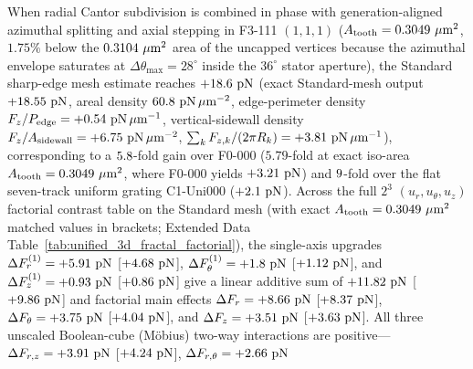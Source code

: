 \documentclass[pdflatex,sn-nature]{sn-jnl}
\DeclareRobustCommand{\roundone}[1]{\fpeval{round(#1,1)}}
\DeclareRobustCommand{\roundtwo}[1]{\fpeval{round(#1,2)}}
\DeclareRobustCommand{\roundthree}[1]{\fpeval{round(#1,3)}}
\DeclareRobustCommand{\roundfour}[1]{\fpeval{round(#1,4)}}
\begin{document}
When radial Cantor subdivision is combined in phase with generation-aligned azimuthal splitting and axial stepping in F3-111 $(1,1,1)$ ($A_{\rm tooth} = \roundfour{\NthreeUnithreedFoneoneoneUnifiedAreaUmtwo}\ \mu\text{m}^2$, $1.75\%$ below the $\roundfour{\NthreeUnithreedFzerozerozeroAreaUmtwo}\ \mu\text{m}^2$ area of the uncapped vertices because the azimuthal envelope saturates at $\Delta\theta_{\max} = 28^\circ$ inside the $36^\circ$ stator aperture), the Standard sharp-edge mesh estimate reaches $+\roundone{\NthreeUnithreedFoneoneoneUnifiedFzPn}\text{ pN}$ (exact Standard-mesh output $+\roundtwo{\NthreeUnithreedFoneoneoneUnifiedFzPn}\text{ pN}$, areal density $\roundone{\NthreeUnithreedFoneoneoneUnifiedFa}\text{ pN}\,\mu\text{m}^{-2}$, edge-perimeter density $F_z/P_{\rm edge} = +\roundthree{\NthreeUnithreedFoneoneoneUnifiedFp}\text{ pN}\,\mu\text{m}^{-1}$, vertical-sidewall density $F_z/A_{\rm sidewall} = +\roundtwo{\NthreeUnithreedFoneoneoneUnifiedFasw}\text{ pN}\,\mu\text{m}^{-2}$, $\sum_k F_{z,k}/(2\pi R_k) = +\roundtwo{\NthreeUnithreedFoneoneoneUnifiedFcirc}\text{ pN}\,\mu\text{m}^{-1}$), corresponding to a $\roundone{\NthreeUnithreedRatioFoneoneoneVsFzerozerozero}$-fold gain over F0-000 ($5.79$-fold at exact iso-area $A_{\rm tooth} = \roundfour{\NthreeUnithreedFoneoneoneUnifiedAreaUmtwo}\ \mu\text{m}^2$, where F0-000 yields $+\roundtwo{\NthreeIsothreezerofournineFzerozerozeroFzPn}\text{ pN}$) and $\roundone{\NthreeUnithreedRatioFoneoneoneVsUnizerozerozero}$-fold over the flat seven-track uniform grating C1-Uni000 ($+\roundone{\NthreeUnithreedCtrlUnizerozerozeroFzPn}\text{ pN}$). Across the full $2^3$ $(u_r, u_\theta, u_z)$ factorial contrast table on the Standard mesh (with exact $A_{\rm tooth} = \roundfour{\NthreeUnithreedFoneoneoneUnifiedAreaUmtwo}\ \mu\text{m}^2$ matched values in brackets; Extended Data Table~\ref{tab:unified_3d_fractal_factorial}), the single-axis upgrades $\Delta F_r^{(1)} = +\roundtwo{\NthreeUnithreedSingleEffectRPn}\text{ pN}$ [$+\roundtwo{\NthreeIsothreezerofournineSingleEffectRPn}\text{ pN}$], $\Delta F_\theta^{(1)} = +\roundtwo{\NthreeUnithreedSingleEffectThetaPn}\text{ pN}$ [$+\roundtwo{\NthreeIsothreezerofournineSingleEffectThetaPn}\text{ pN}$], and $\Delta F_z^{(1)} = +\roundtwo{\NthreeUnithreedSingleEffectZPn}\text{ pN}$ [$+\roundtwo{\NthreeIsothreezerofournineSingleEffectZPn}\text{ pN}$] give a linear additive sum of $+\roundtwo{\NthreeUnithreedLinearAdditiveSumPn}\text{ pN}$ [$+\roundtwo{\NthreeIsothreezerofournineLinearAdditiveSumPn}\text{ pN}$] and factorial main effects $\Delta F_r = +\roundtwo{\NthreeUnithreedMainEffectRPn}\text{ pN}$ [$+\roundtwo{\NthreeIsothreezerofournineMainEffectRPn}\text{ pN}$], $\Delta F_\theta = +\roundtwo{\NthreeUnithreedMainEffectThetaPn}\text{ pN}$ [$+\roundtwo{\NthreeIsothreezerofournineMainEffectThetaPn}\text{ pN}$], and $\Delta F_z = +\roundtwo{\NthreeUnithreedMainEffectZPn}\text{ pN}$ [$+\roundtwo{\NthreeIsothreezerofournineMainEffectZPn}\text{ pN}$]. All three unscaled Boolean-cube (M\"obius) two-way interactions are positive---$\Delta F_{r,z} = +\roundtwo{\NthreeUnithreedSynergyRZPn}\text{ pN}$ [$+\roundtwo{\NthreeIsothreezerofournineSynergyRZPn}\text{ pN}$], $\Delta F_{r,\theta} = +\roundtwo{\NthreeUnithreedSynergyRThetaPn}\text{ pN}$ 
\end{document}
